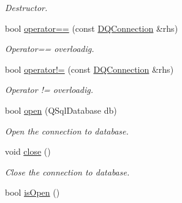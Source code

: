 \begin{DoxyCompactItemize}
\begin{DoxyCompactList}\small\item\em Destructor. \item\end{DoxyCompactList}\item 
bool \hyperlink{classDQConnection_abf0160a423e8a4726ec1867a8fb0ef3b}{operator==} (const \hyperlink{classDQConnection}{DQConnection} \&rhs)
\begin{DoxyCompactList}\small\item\em Operator== overloadig. \item\end{DoxyCompactList}\item 
bool \hyperlink{classDQConnection_af610030a87760d9c230ac15958858ef9}{operator!=} (const \hyperlink{classDQConnection}{DQConnection} \&rhs)
\begin{DoxyCompactList}\small\item\em Operator != overloadig. \item\end{DoxyCompactList}\item 
\hypertarget{classDQConnection_a866ec3798eec9615bbdf491664f6f14f}{
bool \hyperlink{classDQConnection_a866ec3798eec9615bbdf491664f6f14f}{open} (QSqlDatabase db)}
\label{classDQConnection_a866ec3798eec9615bbdf491664f6f14f}

\begin{DoxyCompactList}\small\item\em Open the connection to database. \item\end{DoxyCompactList}\item 
\hypertarget{classDQConnection_ab4508871169186c0a0c2d06cdec4ab37}{
void \hyperlink{classDQConnection_ab4508871169186c0a0c2d06cdec4ab37}{close} ()}
\label{classDQConnection_ab4508871169186c0a0c2d06cdec4ab37}

\begin{DoxyCompactList}\small\item\em Close the connection to database. \item\end{DoxyCompactList}\item 
\hypertarget{classDQConnection_a81e70c3514d30ac768eac6e4dcb37b35}{
bool \hyperlink{classDQConnection_a81e70c3514d30ac768eac6e4dcb37b35}{isOpen} ()}
\label{classDQConnection_a81e70c3514d30ac768eac6e4dcb37b35}


\end{DoxyCompactItemize}
